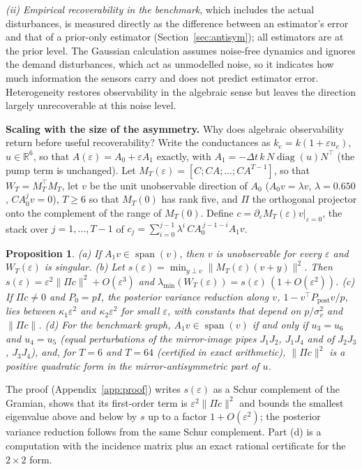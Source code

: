 \documentclass[conference]{IEEEtran}
\newtheorem{proposition}{Proposition}
\begin{document}
\emph{(ii) Empirical recoverability in the benchmark}, which includes the actual disturbances, is measured directly as the difference between an estimator's error and that of a prior-only estimator (Section~\ref{sec:antisym}); all estimators are at the prior level. The Gaussian calculation assumes noise-free dynamics and ignores the demand disturbances, which act as unmodelled noise, so it indicates how much information the sensors carry and does not predict estimator error. Heterogeneity restores observability in the algebraic sense but leaves the direction largely unrecoverable at this noise level.

\textbf{Scaling with the size of the asymmetry.} Why does algebraic observability return before useful recoverability? Write the conductances as $k_e=k(1+\varepsilon u_e)$, $u\in\mathbb R^6$, so that $A(\varepsilon)=A_0+\varepsilon A_1$ exactly, with $A_1=-\Delta t\,k\,N\operatorname{diag}(u)N^\top$ (the pump term is unchanged). Let $M_T(\varepsilon)=[C;CA;\dots;CA^{T-1}]$, so that $W_T=M_T^\top M_T$, let $v$ be the unit unobservable direction of $A_0$ ($A_0v=\lambda v$, $\lambda=0.650$, $CA_0^jv=0$), $T\ge6$ so that $M_T(0)$ has rank five, and $\Pi$ the orthogonal projector onto the complement of the range of $M_T(0)$. Define $c=\partial_\varepsilon M_T(\varepsilon)v|_{\varepsilon=0}$, the stack over $j=1,\dots,T-1$ of $c_j=\sum_{i=0}^{j-1}\lambda^{i}\,CA_0^{\,j-1-i}A_1v$.

\begin{proposition}\label{prop:scaling} (a) If $A_1v\in\operatorname{span}(v)$, then $v$ is unobservable for every $\varepsilon$ and $W_T(\varepsilon)$ is singular. (b) Let $s(\varepsilon)=\min_{y\perp v}\|M_T(\varepsilon)(v+y)\|^2$. Then $s(\varepsilon)=\varepsilon^2\|\Pi c\|^2+O(\varepsilon^3)$ and $\lambda_{\min}(W_T(\varepsilon))=s(\varepsilon)\,(1+O(\varepsilon^2))$. (c) If $\Pi c\ne0$ and $P_0=pI$, the posterior variance reduction along $v$, $1-v^\top P_{\mathrm{post}}v/p$, lies between $\kappa_1\varepsilon^2$ and $\kappa_2\varepsilon^2$ for small $\varepsilon$, with constants that depend on $p/\sigma_v^2$ and $\|\Pi c\|$. (d) For the benchmark graph, $A_1v\in\operatorname{span}(v)$ if and only if $u_3=u_6$ and $u_4=u_5$ (equal perturbations of the mirror-image pipes $J_1J_2$, $J_1J_4$ and of $J_2J_3$, $J_3J_4$), and, for $T=6$ and $T=64$ (certified in exact arithmetic), $\|\Pi c\|^2$ is a positive quadratic form in the mirror-antisymmetric part of $u$.
\end{proposition}

The proof (Appendix~\ref{app:proof}) writes $s(\varepsilon)$ as a Schur complement of the Gramian, shows that its first-order term is $\varepsilon^2\|\Pi c\|^2$ and bounds the smallest eigenvalue above and below by $s$ up to a factor $1+O(\varepsilon^2)$; the posterior variance reduction follows from the same Schur complement. Part (d) is a computation with the incidence matrix plus an exact rational certificate for the $2\times2$ form.
\end{document}
